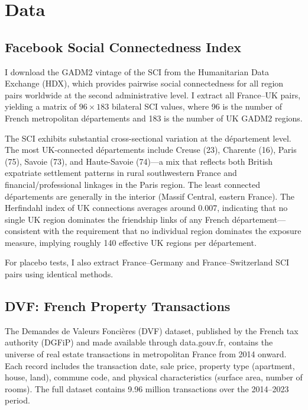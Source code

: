 \documentclass[12pt]{article}
\begin{document}
\section{Data}

\subsection{Facebook Social Connectedness Index}

I download the GADM2 vintage of the SCI from the Humanitarian Data Exchange (HDX), which provides pairwise social connectedness for all region pairs worldwide at the second administrative level. I extract all France--UK pairs, yielding a matrix of $96 \times 183$ bilateral SCI values, where 96 is the number of French metropolitan d\'epartements and 183 is the number of UK GADM2 regions.

The SCI exhibits substantial cross-sectional variation at the d\'epartement level. The most UK-connected d\'epartements include Creuse (23), Charente (16), Paris (75), Savoie (73), and Haute-Savoie (74)---a mix that reflects both British expatriate settlement patterns in rural southwestern France and financial/professional linkages in the Paris region. The least connected d\'epartements are generally in the interior (Massif Central, eastern France). The Herfindahl index of UK connections averages around 0.007, indicating that no single UK region dominates the friendship links of any French d\'epartement---consistent with the requirement that no individual region dominates the exposure measure, implying roughly 140 effective UK regions per d\'epartement.

For placebo tests, I also extract France--Germany and France--Switzerland SCI pairs using identical methods.

\subsection{DVF: French Property Transactions}

The Demandes de Valeurs Fonci\`eres (DVF) dataset, published by the French tax authority (DGFiP) and made available through data.gouv.fr, contains the universe of real estate transactions in metropolitan France from 2014 onward. Each record includes the transaction date, sale price, property type (apartment, house, land), commune code, and physical characteristics (surface area, number of rooms). The full dataset contains 9.96 million transactions over the 2014--2023 period.
\end{document}

